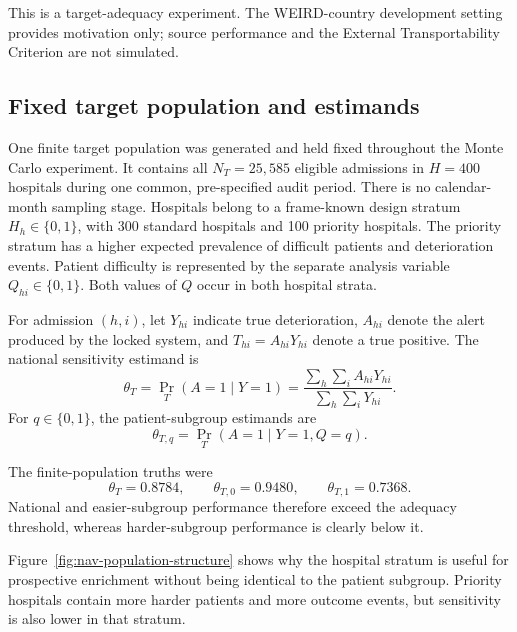 This is a target-adequacy experiment. The WEIRD-country development setting
provides motivation only; source performance and the External Transportability
Criterion are not simulated.

\subsection{Fixed target population and estimands}

One finite target population was generated and held fixed throughout the
Monte Carlo experiment. It contains all \(N_T=25{,}585\) eligible admissions
in \(H=400\) hospitals during one common, pre-specified audit period. There is
no calendar-month sampling stage. Hospitals belong to a frame-known design
stratum \(H_h\in\{0,1\}\), with 300 standard hospitals and 100 priority
hospitals. The priority stratum has a higher expected prevalence of difficult
patients and deterioration events. Patient difficulty is represented by the
separate analysis variable \(Q_{hi}\in\{0,1\}\). Both values of \(Q\) occur
in both hospital strata.

For admission \((h,i)\), let \(Y_{hi}\) indicate true deterioration,
\(A_{hi}\) denote the alert produced by the locked system, and
\(T_{hi}=A_{hi}Y_{hi}\) denote a true positive. The national sensitivity
estimand is
\begin{equation}
  \theta_T
  =
  \Pr_T(A=1\mid Y=1)
  =
  \frac{\sum_h\sum_i A_{hi}Y_{hi}}
       {\sum_h\sum_i Y_{hi}}.
  \label{eq:nav-national-target}
\end{equation}
For \(q\in\{0,1\}\), the patient-subgroup estimands are
\begin{equation}
  \theta_{T,q}
  =
  \Pr_T(A=1\mid Y=1,Q=q).
  \label{eq:nav-subgroup-target}
\end{equation}

The finite-population truths were
\[
  \theta_T=0.8784,
  \qquad
  \theta_{T,0}=0.9480,
  \qquad
  \theta_{T,1}=0.7368.
\]
National and easier-subgroup performance therefore exceed the adequacy
threshold, whereas harder-subgroup performance is clearly below it.



Figure~\ref{fig:nav-population-structure} shows why the hospital stratum is
useful for prospective enrichment without being identical to the patient
subgroup. Priority hospitals contain more harder patients and more outcome
events, but sensitivity is also lower in that stratum.

